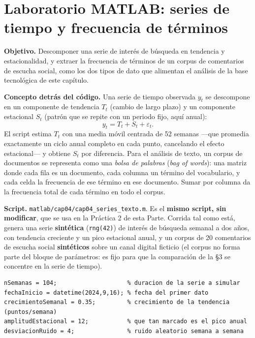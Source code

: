 \section{Laboratorio MATLAB: series de tiempo y frecuencia de términos}

\begin{cajaLaboratorio}
\textbf{Objetivo.} Descomponer una serie de interés de búsqueda en
tendencia y estacionalidad, y extraer la frecuencia de términos de un
corpus de comentarios de escucha social, como los dos tipos de dato que
alimentan el análisis de la base tecnológica de este capítulo.

\textbf{Concepto detrás del código.} Una serie de tiempo observada
$y_t$ se descompone en un componente de tendencia $T_t$ (cambio de largo
plazo) y un componente estacional $S_t$ (patrón que se repite con un
periodo fijo, aquí anual):
\[
  y_t = T_t + S_t + \varepsilon_t.
\]
El script estima $T_t$ con una media móvil centrada de 52 semanas —que
promedia exactamente un ciclo anual completo en cada punto, cancelando el
efecto estacional— y obtiene $S_t$ por diferencia. Para el análisis de
texto, un corpus de documentos se representa como una \textit{bolsa de
palabras} (\textit{bag of words}): una matriz donde cada fila es un
documento, cada columna un término del vocabulario, y cada celda la
frecuencia de ese término en ese documento. Sumar por columna da la
frecuencia total de cada término en todo el corpus.

\textbf{Script.} \texttt{matlab/cap04/cap04\_series\_texto.m}. Es el
\textbf{mismo script, sin modificar}, que se usa en la Práctica 2 de esta
Parte. Corrida tal como está, genera una serie \textbf{sintética}
(\texttt{rng(42)}) de interés de búsqueda semanal a dos años, con tendencia
creciente y un pico estacional anual, y un corpus de 20 comentarios de
escucha social \textbf{sintéticos} sobre un canal digital ficticio (el
corpus no forma parte del bloque de parámetros: es fijo para que la
comparación de la §3 se concentre en la serie de tiempo).

\begin{lstlisting}[style=MATLABStyle, caption={Bloque de parámetros editable (\texttt{cap04\_series\_texto.m}) — es lo único que cambia entre corridas.}]
nSemanas = 104;                    % duracion de la serie a simular
fechaInicio = datetime(2024,9,16); % fecha del primer dato
crecimientoSemanal = 0.35;         % crecimiento de la tendencia (puntos/semana)
amplitudEstacional = 12;           % que tan marcado es el pico anual
desviacionRuido = 4;               % ruido aleatorio semana a semana
\end{lstlisting}


\end{cajaLaboratorio}
